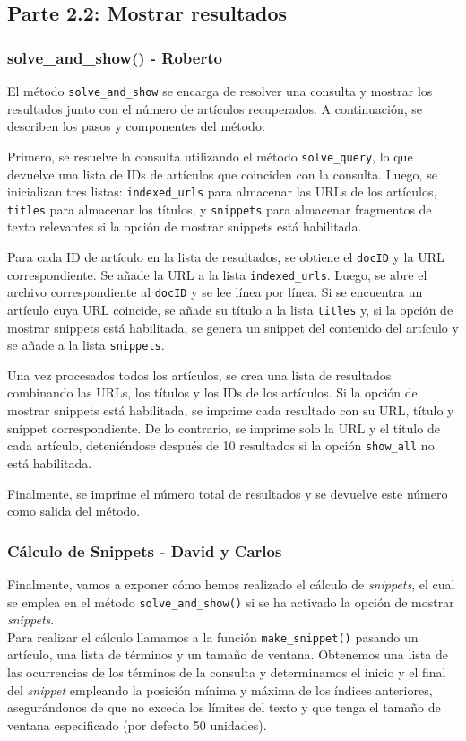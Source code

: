 \documentclass[12pt,a4paper]{article}
\begin{document}
\subsection{Parte 2.2: Mostrar resultados}
\subsubsection{solve\_and\_show() - Roberto}
El método \texttt{solve\_and\_show} se encarga de resolver una consulta y mostrar los resultados junto con el número de artículos recuperados. A continuación, se describen los pasos y componentes del método:

Primero, se resuelve la consulta utilizando el método \texttt{solve\_query}, lo que devuelve una lista de IDs de artículos que coinciden con la consulta. Luego, se inicializan tres listas: \texttt{indexed\_urls} para almacenar las URLs de los artículos, \texttt{titles} para almacenar los títulos, y \texttt{snippets} para almacenar fragmentos de texto relevantes si la opción de mostrar snippets está habilitada.

Para cada ID de artículo en la lista de resultados, se obtiene el \texttt{docID} y la URL correspondiente. Se añade la URL a la lista \texttt{indexed\_urls}. Luego, se abre el archivo correspondiente al \texttt{docID} y se lee línea por línea. Si se encuentra un artículo cuya URL coincide, se añade su título a la lista \texttt{titles} y, si la opción de mostrar snippets está habilitada, se genera un snippet del contenido del artículo y se añade a la lista \texttt{snippets}.

Una vez procesados todos los artículos, se crea una lista de resultados combinando las URLs, los títulos y los IDs de los artículos. Si la opción de mostrar snippets está habilitada, se imprime cada resultado con su URL, título y snippet correspondiente. De lo contrario, se imprime solo la URL y el título de cada artículo, deteniéndose después de 10 resultados si la opción \texttt{show\_all} no está habilitada.

Finalmente, se imprime el número total de resultados y se devuelve este número como salida del método.

\subsubsection{Cálculo de Snippets - David y Carlos}
Finalmente, vamos a exponer cómo hemos realizado el cálculo de \textit{snippets}, el cual se emplea en el método \texttt{solve\_and\_show()} si se ha activado la opción de mostrar \textit{snippets}.\\
Para realizar el cálculo llamamos a la función \texttt{make\_snippet()} pasando un artículo, una lista de términos y un tamaño de ventana. Obtenemos una lista de las ocurrencias de los términos de la consulta y determinamos el inicio y el final del \textit{snippet} empleando la posición mínima y máxima de los índices anteriores, asegurándonos de que no exceda los límites del texto y que tenga el tamaño de ventana especificado (por defecto 50 unidades).
\end{document}
